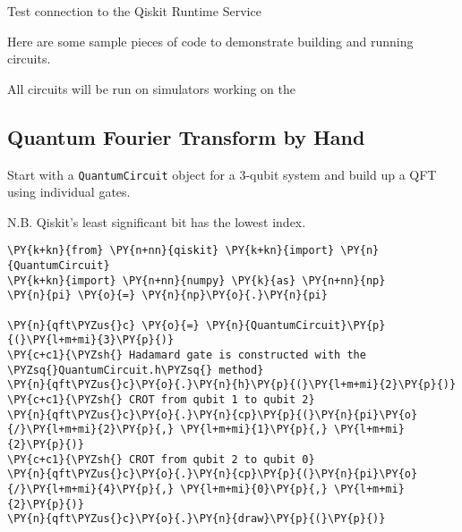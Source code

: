 \begin{listing}[!ht]
\inputminted{python}{tex/code/setup_ibm_service_channel.py}
\caption{Test connection to the Qiskit Runtime Service}
\label{listing:3}
\end{listing}

Here are some sample pieces of code to demonstrate building and running
circuits.

All circuits will be run on simulators working on the

    \hypertarget{quantum-fourier-transform-by-hand}{%
\subsection{Quantum Fourier Transform by
Hand}\label{quantum-fourier-transform-by-hand}}

Start with a \texttt{QuantumCircuit} object for a 3-qubit system and
build up a QFT using individual gates.

N.B. Qiskit's least significant bit has the lowest index.

    \begin{tcolorbox}[breakable, size=fbox, boxrule=1pt, pad at break*=1mm,colback=cellbackground, colframe=cellborder]
\begin{Verbatim}[commandchars=\\\{\}]
\PY{k+kn}{from} \PY{n+nn}{qiskit} \PY{k+kn}{import} \PY{n}{QuantumCircuit}
\PY{k+kn}{import} \PY{n+nn}{numpy} \PY{k}{as} \PY{n+nn}{np}
\PY{n}{pi} \PY{o}{=} \PY{n}{np}\PY{o}{.}\PY{n}{pi}

\PY{n}{qft\PYZus{}c} \PY{o}{=} \PY{n}{QuantumCircuit}\PY{p}{(}\PY{l+m+mi}{3}\PY{p}{)}
\PY{c+c1}{\PYZsh{} Hadamard gate is constructed with the \PYZsq{}QuantumCircuit.h\PYZsq{} method}
\PY{n}{qft\PYZus{}c}\PY{o}{.}\PY{n}{h}\PY{p}{(}\PY{l+m+mi}{2}\PY{p}{)}
\PY{c+c1}{\PYZsh{} CROT from qubit 1 to qubit 2}
\PY{n}{qft\PYZus{}c}\PY{o}{.}\PY{n}{cp}\PY{p}{(}\PY{n}{pi}\PY{o}{/}\PY{l+m+mi}{2}\PY{p}{,} \PY{l+m+mi}{1}\PY{p}{,} \PY{l+m+mi}{2}\PY{p}{)}
\PY{c+c1}{\PYZsh{} CROT from qubit 2 to qubit 0}
\PY{n}{qft\PYZus{}c}\PY{o}{.}\PY{n}{cp}\PY{p}{(}\PY{n}{pi}\PY{o}{/}\PY{l+m+mi}{4}\PY{p}{,} \PY{l+m+mi}{0}\PY{p}{,} \PY{l+m+mi}{2}\PY{p}{)} 
\PY{n}{qft\PYZus{}c}\PY{o}{.}\PY{n}{draw}\PY{p}{(}\PY{p}{)}
\end{Verbatim}
\end{tcolorbox}
 
            
    
    \begin{center}
    \end{center}
    { \hspace*{\fill} \\}
    

